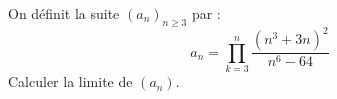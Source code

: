 On définit la suite $(a_n)_{n\ge 3}$ par :
$$a_n=\prod \limits_{k=3}^n\frac{(n^3+3n)^2}{n^6-64}$$
Calculer la limite de $(a_n)$.